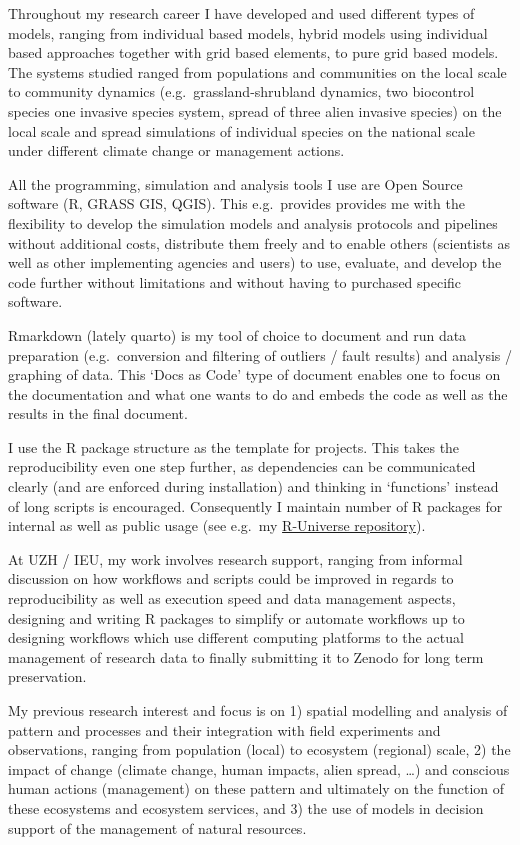 \documentclass[a4paper]{article}
\begin{document}
Throughout my research career I have developed and used different types of
	models, ranging from individual based models, hybrid models using
	individual based approaches together with grid based elements, to pure
	grid based models. The systems studied ranged from populations and
	communities on the local scale to community dynamics (e.g.\ 
	grassland-shrubland dynamics, two biocontrol species one invasive species system,
	spread of three alien invasive species) on the local scale and spread
	simulations of individual species on the national scale under different
	climate change or management actions.

All the programming, simulation and analysis tools I use are Open
	Source software (R, GRASS GIS, QGIS). This e.g.\ provides provides me
	with the flexibility to develop the simulation models and analysis
	protocols and pipelines without additional costs, distribute them
	freely and to enable others (scientists as well as other implementing
	agencies and users) to use, evaluate, and develop the code further
	without limitations and without having to purchased specific
	software. 
	
Rmarkdown (lately quarto) is my tool of choice to document and run data
	preparation (e.g.\ conversion and filtering of outliers / fault
	results) and analysis / graphing of data. This `Docs as Code' type of
	document enables one to focus on the documentation and what one wants
	to do and embeds the code as well as the results in the final document.

I use the R package structure as the template for projects. This takes
	the reproducibility even one step further, as dependencies can be
	communicated clearly (and are enforced during installation) and
	thinking in `functions' instead of long scripts is encouraged.
	Consequently I maintain number of R packages for internal as well as
	public usage (see e.g.\ my
	\href{https://rkrug.r-universe.dev/builds}{R-Universe repository}).

At UZH / IEU, my work involves research support,
	ranging from informal discussion on how workflows and scripts could
	be improved in regards to reproducibility as well as execution speed
	and data management aspects, designing and writing R packages to
	simplify or automate workflows up to designing workflows which use
	different computing platforms to the actual management of research
	data to finally submitting it to Zenodo for long term preservation.
	
My previous research interest and focus is on 1) spatial modelling and
	analysis of pattern and processes and their integration with field
	experiments and observations, ranging from population (local) to
	ecosystem (regional) scale, 2) the impact of change (climate change,
	human impacts, alien spread, \ldots{}) and conscious human actions
	(management) on these pattern and ultimately on the function of these
	ecosystems and ecosystem services, and 3) the use of models in decision
	support of the management of natural resources.
\end{document}
